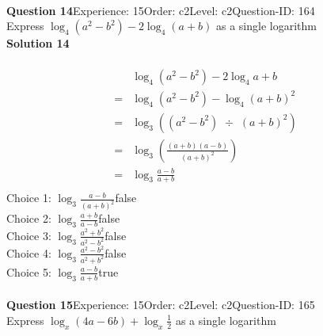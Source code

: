 \documentclass{article}
\begin{document}
\\[4pt]
\noindent\textbf{Question 14}\hspace{20pt}Experience: 15\hspace{20pt}Order: c2\hspace{20pt}Level: c2\hspace{20pt}Question-ID: 164\\[2pt]
Express $\log_{4}(a^2-b^2)-2\log_{4}(a+b)$ as a single logarithm\\[4pt]
\noindent\textbf{Solution 14}\\[2pt]
\\[-35pt]\begin{align*}
&\log_{4}(a^2-b^2)-2\log_{4}a+b\\[2pt]
=&\log_{4}(a^2-b^2)-\log_{4}(a+b)^2\\[2pt]
=&\log_{3}((a^2-b^2) \,\, \div \,\, (a+b)^2)\\[2pt]
=&\log_{3}\left(\displaystyle\frac{(a+b)(a-b)}{(a+b)^2}\right)\\[2pt]
=&\log_{3}\displaystyle\frac{a-b}{a+b}\\[-130pt]
\end{align*}
Choice 1: \hspace{20pt}$\log_{3}\displaystyle\frac{a-b}{(a+b)^2}$\hspace{20pt}false\\
Choice 2: \hspace{20pt}$\log_{3}\displaystyle\frac{a+b}{a-b}$\hspace{20pt}false\\
Choice 3: \hspace{20pt}$\log_{3}\displaystyle\frac{a^2+b^2}{a^2-b^2}$\hspace{20pt}false\\
Choice 4: \hspace{20pt}$\log_{3}\displaystyle\frac{a^2-b^2}{a^2+b^2}$\hspace{20pt}false\\
Choice 5: \hspace{20pt}$\log_{3}\displaystyle\frac{a-b}{a+b}$\hspace{20pt}true\\
\\[4pt]
\noindent\textbf{Question 15}\hspace{20pt}Experience: 15\hspace{20pt}Order: c2\hspace{20pt}Level: c2\hspace{20pt}Question-ID: 165\\[2pt]
Express $\log_{x}(4a-6b)+\log_{x}\displaystyle\frac{1}{2}$ as a single logarithm\\[4pt]
\end{document}

